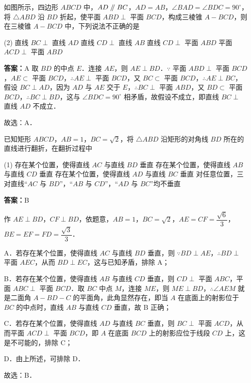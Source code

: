
\begin{example}[\bkstar{3}{5}]
如图所示，四边形 $ABCD$ 中，$AD\mathrel{/\mkern-5mu/} BC$，$AD=AB$，$\angle BAD=\angle BDC=90^{\circ}$，将 $\triangle ABD$ 沿 $BD$ 折起，使平面 $ABD\perp$ 平面 $BCD$，构成三棱锥 $A-BCD$，则在三棱锥 $A-BCD$ 中，下列说法不正确的是
\begin{tasks}(2)
    \task 直线 $BC\perp$ 直线 $AD$
    \task 直线 $CD\perp$ 直线 $AB$
    \task 直线 $CD\perp$ 平面 $ABD$
    \task 平面 $ACD\perp$ 平面 $ABD$
\end{tasks}
\end{example}
\begin{solution}
\textbf{答案：}A
取 $BD$ 的中点 $E$．连接 $AE$，则 $AE\perp BD$．$\because$ 平面 $ABD\perp$ 平面 $BCD$，$AE\subset$ 平面 $BCD$，$\therefore AE\perp$ 平面 $BCD$，又 $BC\subset$ 平面 $BCD$，$\therefore AE\perp BC$，假设 $BC\perp AD$，因为 $AD$ 与 $AE$ 交于 $E$，$\therefore BC\perp$ 平面 $ABD$，又 $BD\subset$ 平面 $BCD$，$\therefore BC\perp BD$，这与 $\angle BDC=90^{\circ}$ 相矛盾，故假设不成立，即直线 $BC\perp$ 直线 $AD$ 不成立．%

故选：A．
\end{solution}

\vspace{2em}

\begin{example}[\bkstar{4}{5}]
已知矩形 $ABCD$，$AB=1$，$BC=\sqrt{2}$，将 $\triangle ABD$ 沿矩形的对角线 $BD$ 所在的直线进行翻折，在翻折过程中
\begin{tasks}(1)
    \task 存在某个位置，使得直线 $AC$ 与直线 $BD$ 垂直
    \task 存在某个位置，使得直线 $AB$ 与直线 $CD$ 垂直
    \task 存在某个位置，使得直线 $AD$ 与直线 $BC$ 垂直
    \task 对任意位置，三对直线“$AC$ 与 $BD$”，“$AB$ 与 $CD$”，“$AD$ 与 $BC$”均不垂直
\end{tasks}
\end{example}
\begin{solution}
\textbf{答案：}B

作 $AE\perp BD$，$CF\perp BD$，依题意，$AB=1$，$BC=\sqrt{2}$，$AE=CF=\dfrac{\sqrt{6}}{3}$，$BE=EF=FD=\dfrac{\sqrt{3}}{3}$．

A．若存在某个位置，使得直线 $AC$ 与直线 $BD$ 垂直，则 $\because BD\perp AE$，$\therefore BD\perp$ 平面 $AEC$，从而 $BD\perp EC$，这与已知矛盾，排除 A；

B．若存在某个位置，使得直线 $AB$ 与直线 $CD$ 垂直，则 $CD\perp$ 平面 $ABC$，平面 $ABC\perp$ 平面 $BCD$．取 $BC$ 中点 $M$，连接 $ME$，则 $ME\perp BD$，$\therefore \angle AEM$ 就是二面角 $A-BD-C$ 的平面角，此角显然存在，即当 $A$ 在底面上的射影位于 $BC$ 的中点时，直线 $AB$ 与直线 $CD$ 垂直，故 B 正确；

C．若存在某个位置，使得直线 $AD$ 与直线 $BC$ 垂直，则 $BC\perp$ 平面 $ACD$，从而平面 $ACD\perp$ 平面 $BCD$，即 $A$ 在底面 $BCD$ 上的射影应位于线段 $CD$ 上，这是不可能的，排除 C；

D．由上所述，可排除 D．

故选：B．
\end{solution}

